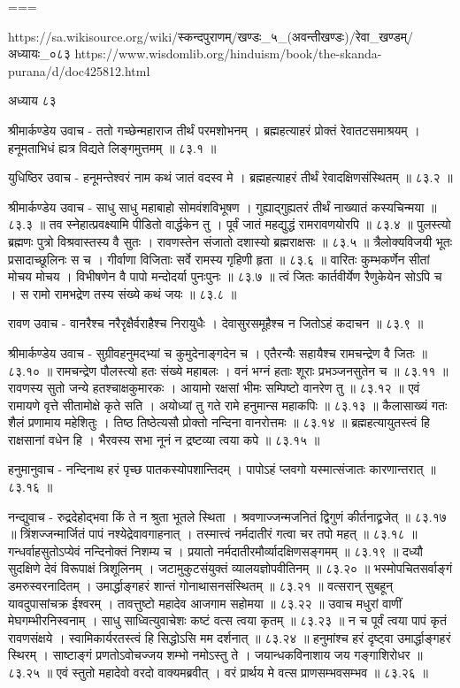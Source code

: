 ===

https://sa.wikisource.org/wiki/स्कन्दपुराणम्/खण्डः_५_(अवन्तीखण्डः)/रेवा_खण्डम्/अध्यायः_०८३
https://www.wisdomlib.org/hinduism/book/the-skanda-purana/d/doc425812.html

अध्याय ८३

श्रीमार्कण्डेय उवाच -
ततो गच्छेन्महाराज तीर्थं परमशोभनम् ।
ब्रह्महत्याहरं प्रोक्तं रेवातटसमाश्रयम् ।
हनूमताभिधं ह्यत्र विद्यते लिङ्गमुत्तमम् ॥ ८३.१ ॥

युधिष्ठिर उवाच -
हनूमन्तेश्वरं नाम कथं जातं वदस्व मे ।
ब्रह्महत्याहरं तीर्थं रेवादक्षिणसंस्थितम् ॥ ८३.२ ॥

श्रीमार्कण्डेय उवाच -
साधु साधु महाबाहो सोमवंशविभूषण ।
गुह्याद्गुह्यतरं तीर्थं नाख्यातं कस्यचिन्मया ॥ ८३.३ ॥
तव स्नेहात्प्रवक्ष्यामि पीडितो वार्द्धकेन तु ।
पूर्वं जातं महद्युद्धं रामरावणयोरपि ॥ ८३.४ ॥
पुलस्त्यो ब्रह्मणः पुत्रो विश्रवास्तस्य वै सुतः ।
रावणस्तेन संजातो दशास्यो ब्रह्मराक्षसः ॥ ८३.५ ॥
त्रैलोक्यविजयी भूतः प्रसादाच्छूलिनः स च ।
गीर्वाणा विजिताः सर्वे रामस्य गृहिणी हृता ॥ ८३.६ ॥
वारितः कुम्भकर्णेन सीतां मोचय मोचय ।
विभीषणेन वै पापो मन्दोदर्या पुनःपुनः ॥ ८३.७ ॥
त्वं जितः कार्तवीर्येण रैणुकेयेन सोऽपि च ।
स रामो रामभद्रेण तस्य संख्ये कथं जयः ॥ ८३.८ ॥

रावण उवाच -
वानरैश्च नरैरृक्षैर्वराहैश्च निरायुधैः ।
देवासुरसमूहैश्च न जितोऽहं कदाचन ॥ ८३.९ ॥

श्रीमार्कण्डेय उवाच -
सुग्रीवहनुमद्भ्यां च कुमुदेनाङ्गदेन च ।
एतैरन्यैः सहायैश्च रामचन्द्रेण वै जितः ॥ ८३.१० ॥
रामचन्द्रेण पौलस्त्यो हतः संख्ये महाबलः ।
वनं भग्नं हताः शूराः प्रभञ्जनसुतेन च ॥ ८३.११ ॥
रावणस्य सुतो जन्ये हतश्चाक्षकुमारकः ।
आयामो रक्षसां भीमः सम्पिष्टो वानरेण तु ॥ ८३.१२ ॥
एवं रामायणे वृत्ते सीतामोक्षे कृते सति ।
अयोध्यां तु गते रामे हनुमान्स महाकपिः ॥ ८३.१३ ॥
कैलासाख्यं गतः शैलं प्रणामाय महेशितुः ।
तिष्ठ तिष्ठेत्यसौ प्रोक्तो नन्दिना वानरोत्तमः ॥ ८३.१४ ॥
ब्रह्महत्यायुतस्त्वं हि राक्षसानां वधेन हि ।
भैरवस्य सभा नूनं न द्रष्टव्या त्वया कपे ॥ ८३.१५ ॥

हनुमानुवाच -
नन्दिनाथ हरं पृच्छ पातकस्योपशान्तिदम् ।
पापोऽहं प्लवगो यस्मात्संजातः कारणान्तरात् ॥ ८३.१६ ॥

नन्द्युवाच -
रुद्रदेहोद्भवा किं ते न श्रुता भूतले स्थिता ।
श्रवणाज्जन्मजनितं द्विगुणं कीर्तनाद्व्रजेत् ॥ ८३.१७ ॥
त्रिंशज्जन्मार्जितं पापं नश्येद्रेवावगाहनात् ।
तस्मात्त्वं नर्मदातीरं गत्वा चर तपो महत् ॥ ८३.१८ ॥
गन्धर्वाहसुतोऽप्येवं नन्दिनोक्तं निशम्य च ।
प्रयातो नर्मदातीरमौर्व्यादक्षिणसङ्गमम् ॥ ८३.१९ ॥
दध्यौ सुदक्षिणे देवं विरूपाक्षं त्रिशूलिनम् ।
जटामुकुटसंयुक्तं व्यालयज्ञोपवीतिनम् ॥ ८३.२० ॥
भस्मोपचितसर्वाङ्गं डमरुस्वरनादितम् ।
उमार्द्धाङ्गहरं शान्तं गोनाथासनसंस्थितम् ॥ ८३.२१ ॥
वत्सरान् सुबहून् यावदुपासांचक्र ईश्वरम् ।
तावत्तुष्टो महादेव आजगाम सहोमया ॥ ८३.२२ ॥
उवाच मधुरां वाणीं मेघगम्भीरनिस्वनाम् ।
साधु साध्वित्युवाचेशः कष्टं वत्स त्वया कृतम् ॥ ८३.२३ ॥
न च पूर्वं त्वया पापं कृतं रावणसंक्षये ।
स्वामिकार्यरतस्त्वं हि सिद्धोऽसि मम दर्शनात् ॥ ८३.२४ ॥
हनुमांश्च हरं दृष्ट्वा उमार्द्धाङ्गहरं स्थिरम् ।
साष्टाङ्गं प्रणतोऽवोचज्जय शम्भो नमोऽस्तु ते ।
जयान्धकविनाशाय जय गङ्गाशिरोधर ॥ ८३.२५ ॥
एवं स्तुतो महादेवो वरदो वाक्यमब्रवीत् ।
वरं प्रार्थय मे वत्स प्राणसम्भवसम्भव ॥ ८३.२६ ॥

